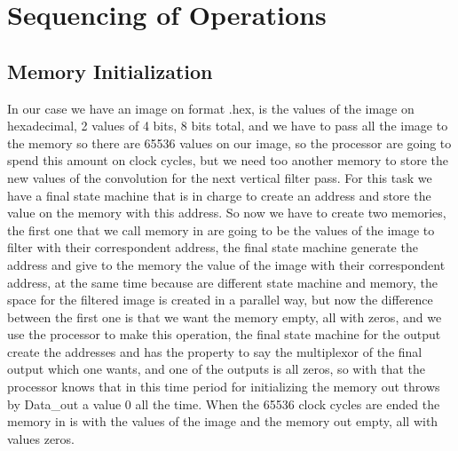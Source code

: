 \documentclass[11pt,a4paper]{article}
\begin{document}
\FloatBarrier
\section{Sequencing of Operations}
\subsection{Memory Initialization}
In our case we have an image on format .hex, is the values of the image on hexadecimal, 2 values of 4 bits, 8 bits total, and we have to pass all the image to the memory so there are 65536 values on our image, so the processor are going to spend this amount on clock cycles, but we need too another memory to store the new values of the convolution for the next vertical filter pass. For this task we have a final state machine that is in charge to create an address and store the value on the memory with this address. So now we have to create two memories, the first one that we call memory in are going to be the values of the image to filter with their correspondent address, the final state machine generate the address and give to the memory the value of the image with their correspondent address, at the same time because are different state machine and memory, the space for the filtered image is created in a parallel way, but now the difference between the first one is that we want the memory empty, all with zeros, and we use the processor to make this operation, the final state machine for the output create the addresses and has the property to say the multiplexor of the final output which one wants, and one of the outputs is all zeros, so with that the processor knows that in this time period for initializing the memory out throws by Data\_out a value 0 all the time.
When the 65536 clock cycles are ended the memory in is with the values of the image and the memory out empty, all with values zeros.	
\end{document}
